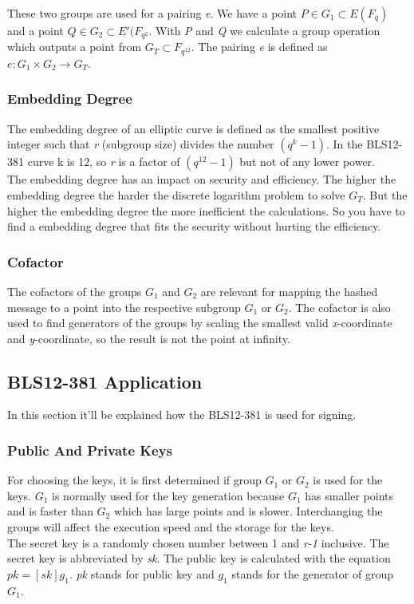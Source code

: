 \documentclass{article}
\begin{document}
These two groups are used for a pairing \textit{e}. We have a point \(P \in G_1 \subset E(F_q) \) and a point \(Q \in G_2 \subset E'(F_{q^2}\). With \textit{P} and \textit{Q} we calculate a group operation which outputs a point from \(G_T \subset F_{q^{12}}\). The pairing \textit{e} is defined as \(e : G_1 \times G_2 \xrightarrow{} G_T\).

\subsubsection{Embedding Degree}
The embedding degree of an elliptic curve is defined as the smallest positive integer such that \textit{r} (subgroup size) divides the number \((q^k -1)\). In the BLS12-381 curve k is 12, so \textit{r} is a factor of \((q^{12} - 1)\) but not of any lower power. \\
The embedding degree has an impact on security and efficiency. The higher the embedding degree the harder the discrete logarithm problem to solve \(G_T\). But the higher the embedding degree the more inefficient the calculations. So you have to find a embedding degree that fits the security without hurting the efficiency. 

\subsubsection{Cofactor}
The cofactors of the groups \(G_1\) and \(G_2\) are relevant for mapping the hashed message to a point into the respective subgroup \(G_1\) or \(G_2\). The cofactor is also used to find generators of the groups by scaling the smallest valid \textit{x}-coordinate and \textit{y}-coordinate, so the result is not the point at infinity. 

\subsection{BLS12-381 Application}

In this section it'll be explained how the BLS12-381 is used for signing.

\subsubsection{Public And Private Keys}
For choosing the keys, it is first determined if group \(G_1\) or \(G_2\) is used for the keys. \(G_1\) is normally used for the key generation because \(G_1\) has smaller points and is faster than \(G_2\) which has large points and is slower. Interchanging the groups will affect the execution speed and the storage for the keys.\\
The secret key is a randomly chosen number between 1 and \textit{r-1} inclusive. The secret key is abbreviated by \textit{sk}. The public key is calculated with the equation \(pk = [sk]g_1\). \textit{pk} stands for public key and \(g_1\) stands for the generator of group \(G_1\).
\end{document}
